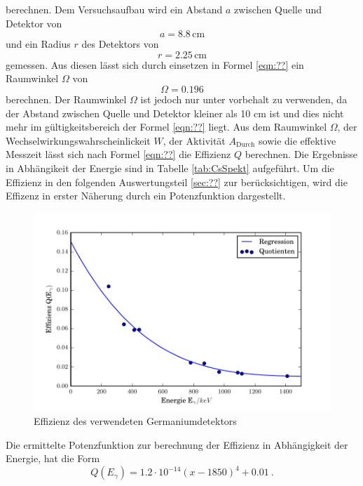 berechnen. Dem Versuchsaufbau wird ein Abstand $a$ zwischen Quelle und Detektor von
\begin{equation}
  a = 8.8 \, \text{cm}
  \label{<++>}
\end{equation}
und ein Radius $r$ des Detektors von
\begin{equation}
  r = 2.25 \, \text{cm}
  \label{<++>}
\end{equation}
gemessen. Aus diesen lässt sich durch einsetzen in Formel \ref{eqn:??} ein Raumwinkel $\Omega$ von
\begin{equation}
  \Omega = 0.196
  \label{eqn:Raum}
\end{equation}
berechnen. Der Raumwinkel $\Omega$ ist jedoch nur unter vorbehalt zu verwenden, da der Abstand zwischen Quelle und Detektor kleiner als 10 cm ist und dies nicht mehr im gültigkeitsbereich der Formel \ref{eqn:??} liegt. Aus dem Raumwinkel $\Omega$, der Wechselwirkungswahrscheinlickeit $W$, der Aktivität $A_\text{Durch}$ sowie die effektive Messzeit lässt sich nach Formel \ref{eqn:??} die Effizienz $Q$ berechnen. Die Ergebnisse in Abhängikeit der Energie sind in Tabelle \ref{tab:CsSpekt} aufgeführt. Um die Effizienz in den folgenden Auswertungsteil \ref{sec:??} zur berücksichtigen, wird die Effizenz in erster Näherung durch ein Potenzfunktion dargestellt.
\begin{figure}[H]
  \centering
  \includegraphics[width=\textwidth]{./build/Effizienz.pdf}
  \caption{Effizienz des verwendeten Germaniumdetektors}
  \label{fig:Efi}
\end{figure}
Die ermittelte Potenzfunktion zur berechnung der Effizienz in Abhängigkeit der Energie, hat die Form
\begin{equation}
  Q(E_\gamma)= 1.2 \cdot 10^{-14} \left( x - 1850 \right)^4 + 0.01 \ .
  \label{eqn:QCs}
\end{equation}
